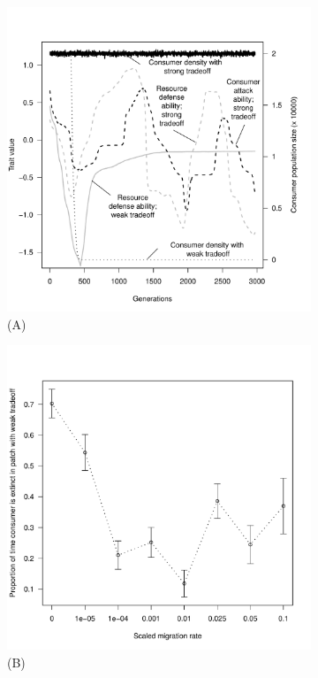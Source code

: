 \documentclass[11pt]{article}
\begin{document}
\begin{figure}[h!]
   \centering
   \begin{subfigure}[b]{0.49\textwidth}
    \centering
   \includegraphics[width=\linewidth] {SupplementaryFigures/FigS3A.pdf}\quad
	\caption*{(A)}        
	\vspace{-1\baselineskip}

	\end{subfigure}
   \begin{subfigure}[b]{0.49\textwidth}
    \centering
   \includegraphics[width=\linewidth] {SupplementaryFigures/FigS3B.pdf}\quad
	\caption*{(B)}
        \vspace{-1\baselineskip}
  	\end{subfigure}
\caption*{}

\end{figure}
\end{document}
